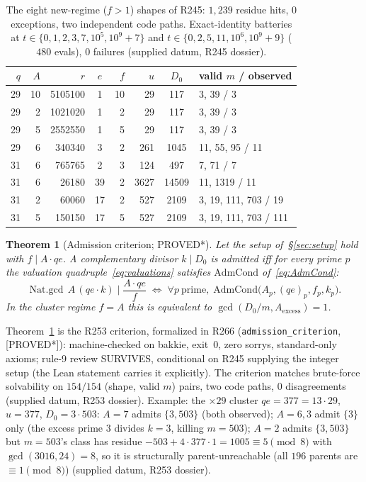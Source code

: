 \documentclass[11pt,a4paper]{article}
\newtheorem{theorem}{Theorem}
\theoremstyle{definition}
\begin{document}
\begin{table}[t]
  \centering
  \caption{The eight new-regime ($f>1$) shapes of R245: $1{,}239$ residue
    hits, $0$ exceptions, two independent code paths. Exact-identity
    batteries at $t\in\{0,1,2,3,7,10^5,10^9+7\}$ and
    $t\in\{0,2,5,11,10^6,10^9+9\}$ ($480$ evals), $0$ failures (supplied
    datum, R245 dossier).}
  \label{tab:r245shapes}
  \begin{tabular}{rrrcrrcl}
    \toprule
    $q$ & $A$ & $r$ & $e$ & $f$ & $u$ & $D_0$ & valid $m$ / observed \\
    \midrule
    29 & 10 & 5105100 & 1 & 10 & 29 & 117 & 3, 39 / 3 \\
    29 & 2  & 1021020 & 1 & 2  & 29 & 117 & 3, 39 / 3 \\
    29 & 5  & 2552550 & 1 & 5  & 29 & 117 & 3, 39 / 3 \\
    29 & 6  & 340340  & 3 & 2  & 261 & 1045 & 11, 55, 95 / 11 \\
    31 & 6  & 765765  & 2 & 3  & 124 & 497 & 7, 71 / 7 \\
    31 & 6  & 26180   & 39 & 2 & 3627 & 14509 & 11, 1319 / 11 \\
    31 & 2  & 60060   & 17 & 2 & 527 & 2109 & 3, 19, 111, 703 / 19 \\
    31 & 5  & 150150  & 17 & 5 & 527 & 2109 & 3, 19, 111, 703 / 111 \\
    \bottomrule
  \end{tabular}
\end{table}

\begin{theorem}[Admission criterion; PROVED*]
  \label{thm:admit}
  Let the setup of~\S\ref{sec:setup} hold with $f\mid A\cdot qe$.
  A complementary divisor $k\mid D_0$ is admitted iff for every prime
  $p$ the valuation quadruple~\eqref{eq:valuations} satisfies
  $\mathrm{AdmCond}$ of~\eqref{eq:AdmCond}:
  \begin{equation}
    \operatorname{Nat.gcd}\,A\,(qe\cdot k)\mid\frac{A\cdot qe}{f}
    \;\Longleftrightarrow\;
    \forall p\ \mathrm{prime},\;
    \mathrm{AdmCond}\bigl(A_p,(qe)_p,f_p,k_p\bigr).
  \end{equation}
  In the cluster regime $f=A$ this is equivalent to
  $\gcd(D_0/m,A_{\mathrm{excess}})=1$.
\end{theorem}

Theorem~\ref{thm:admit} is the R253 criterion, formalized in R266
(\texttt{admission\_criterion}, [PROVED*]): machine-checked on bakkie,
exit~$0$, zero sorrys, standard-only axioms; rule-9 review SURVIVES,
conditional on R245 supplying the integer setup (the Lean statement
carries it explicitly). The criterion matches brute-force solvability on
$154/154$ (shape, valid $m$) pairs, two code paths, $0$ disagreements
(supplied datum, R253 dossier). Example: the $\times29$ cluster
$qe=377=13\cdot29$, $u=377$, $D_0=3\cdot503$: $A=7$ admits $\{3,503\}$
(both observed); $A=6,3$ admit $\{3\}$ only (the excess prime $3$
divides $k=3$, killing $m=503$); $A=2$ admits $\{3,503\}$ but
$m=503$'s class has residue $-503+4\cdot377\cdot1=1005\equiv5\pmod8$ with
$\gcd(3016,24)=8$, so it is structurally parent-unreachable (all $196$
parents are $\equiv1\pmod8$) (supplied datum, R253 dossier).
\end{document}

